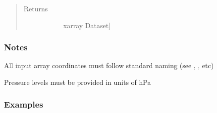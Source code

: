 \documentclass[letterpaper,10pt,english]{sphinxmanual}
\begin{document}
\begin{fulllineitems}
\begin{quote}
\begin{description}
\begin{description}
\end{description}

\item[{Returns}] \leavevmode\begin{description}
\item[{}] \leavevmode{[}xarray Dataset{]}

\end{description}

\end{description}\end{quote}
\subsubsection*{Notes}

\begin{DUlineblock}{0em}
\item[] All input array coordinates must follow standard naming (see ,                 , etc)
\item[] Pressure levels must be provided in units of hPa
\end{DUlineblock}
\subsubsection*{Examples}


\end{fulllineitems}
\end{document}
